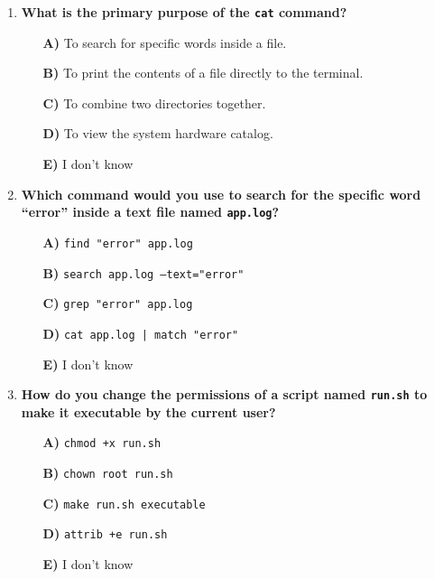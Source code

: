 \begin{appendix}
\begin{enumerate}
    \item \textbf{What is the primary purpose of the \texttt{cat} command?}
    \begin{itemize}
        \item[\textbf{A)}] To search for specific words inside a file.
        \item[\textbf{B)}] To print the contents of a file directly to the terminal.
        \item[\textbf{C)}] To combine two directories together.
        \item[\textbf{D)}] To view the system hardware catalog.
        \item[\textbf{E)}] I don't know
    \end{itemize}

    \item \textbf{Which command would you use to search for the specific word ``error'' inside a text file named \texttt{app.log}?}
    \begin{itemize}
        \item[\textbf{A)}] \texttt{find "error" app.log}
        \item[\textbf{B)}] \texttt{search app.log --text="error"}
        \item[\textbf{C)}] \texttt{grep "error" app.log}
        \item[\textbf{D)}] \texttt{cat app.log | match "error"}
        \item[\textbf{E)}] I don't know
    \end{itemize}

    \item \textbf{How do you change the permissions of a script named \texttt{run.sh} to make it executable by the current user?}
    \begin{itemize}
        \item[\textbf{A)}] \texttt{chmod +x run.sh}
        \item[\textbf{B)}] \texttt{chown root run.sh}
        \item[\textbf{C)}] \texttt{make run.sh executable}
        \item[\textbf{D)}] \texttt{attrib +e run.sh}
        \item[\textbf{E)}] I don't know
    \end{itemize}


\end{enumerate}
\end{appendix}
